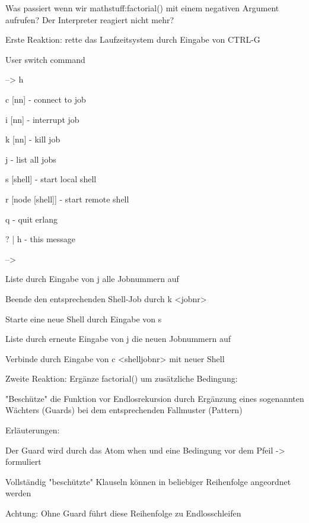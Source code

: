 \documentclass[10pt]{article}
\begin{document}
\begin{itemize*}
Was passiert wenn wir mathstuff:factorial() mit einem negativen Argument aufrufen? Der Interpreter reagiert nicht mehr?
\begin{itemize*}
  \item Erste Reaktion: rette das Laufzeitsystem durch Eingabe von CTRL-G
  \begin{itemize*}
    \item User switch command
    \begin{enumerate*}
      \item --> h
      \item  c [nn] - connect to job
      \item i [nn] - interrupt job
      \item k [nn] - kill job
      \item j - list all jobs
      \item s [shell] - start local shell
      \item r [node [shell]] - start remote shell
      \item q - quit erlang
      \item ? | h - this message
      \item -->
    \end{enumerate*}
    \item Liste durch Eingabe von j alle Jobnummern auf
    \item Beende den entsprechenden Shell-Job durch k <jobnr>
    \item Starte eine neue Shell durch Eingabe von s
    \item Liste durch erneute Eingabe von j die neuen Jobnummern auf
    \item Verbinde durch Eingabe von c <shelljobnr> mit neuer Shell
  \end{itemize*}
  \item Zweite Reaktion: Ergänze factorial() um zusätzliche Bedingung:
  \begin{itemize*}
    \item "Beschütze" die Funktion vor Endlosrekursion durch Ergänzung eines sogenannten Wächters (Guards) bei dem entsprechenden Fallmuster  (Pattern)
    \item Erläuterungen:
    \begin{itemize*}
      \item Der Guard wird durch das Atom when und eine Bedingung vor dem Pfeil -> formuliert
      \item Vollständig "beschützte" Klauseln können in beliebiger Reihenfolge angeordnet werden
      \item Achtung: Ohne Guard führt diese Reihenfolge zu Endlosschleifen

\end{itemize*}
\end{itemize*}
\end{itemize*}
\end{itemize*}
\end{document}
